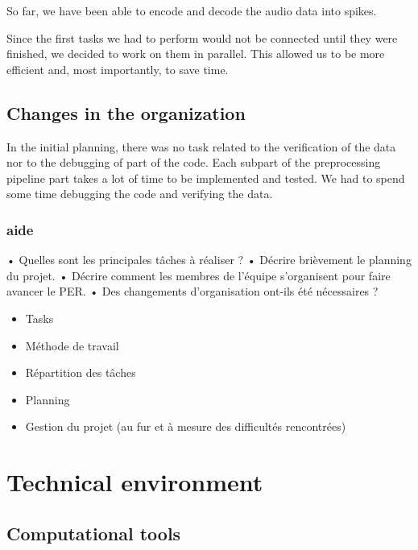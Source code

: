 \documentclass[11pt]{article}
\begin{document}
So far, we have been able to encode and decode the audio data into spikes.


Since the first tasks we had to perform would not be connected until they were finished, we decided to work on them in parallel. This allowed us to be more efficient and, most importantly, to save time.

\subsection{Changes in the organization}

In the initial planning, there was no task related to the verification of the data nor to the debugging of part of the code. Each subpart of the preprocessing pipeline part takes a lot of time to be implemented and tested. We had to spend some time debugging the code and verifying the data. 



\subsubsection*{aide}

•	Quelles sont les principales tâches à réaliser ?
•	Décrire brièvement le planning du projet.
•	Décrire comment les membres de l’équipe s’organisent pour faire avancer le PER.
•	Des changements d’organisation ont-ils été nécessaires ?


\begin{itemize}
  \item Tasks
  \item Méthode de travail
  \item Répartition des tâches
  \item Planning
  \item Gestion du projet (au fur et à mesure des difficultés rencontrées)
\end{itemize}

\pagebreak

\section{Technical environment}

\subsection{Computational tools}
\end{document}
